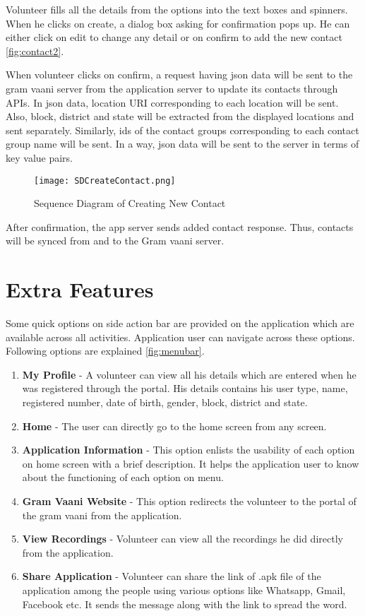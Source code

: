 \begin{itemize}
Volunteer fills all the details from the options into the text boxes and spinners. When he clicks on create, a dialog box asking for confirmation pops up. He can either click on edit to change any detail or on confirm to add the new contact \ref{fig:contact2}.

When volunteer clicks on confirm, a request having json data will be sent to the  gram vaani server from the application server to update its contacts through APIs. In json data, location URI corresponding to each location will be sent. Also, block, district and state will be extracted from the displayed locations and sent separately. Similarly, ids of the contact groups corresponding to each contact group name will be sent. In a way, json data will be sent to the server in terms of key value pairs.

\begin{figure}[H]
    \centering
	\texttt{[image: SDCreateContact.png]}
    \caption{ Sequence Diagram of Creating New Contact}
    \label{fig:Sequence Diagram of Creating New Contact}
\end{figure}

 After confirmation, the app server sends added contact response. Thus, contacts will be synced from and to the Gram vaani server.

\section{Extra Features}

Some quick options on side action bar are provided on the application which are available across all activities. Application  user can navigate across these options. Following options are explained \ref{fig:menubar}.
\begin{enumerate}
\item \textbf {My Profile} - A volunteer can view all his details which are entered when he was registered through the portal. His details contains his user type, name, registered number, date of birth, gender, block, district and state.
\item \textbf{Home} - The user can directly go to the home screen from any screen.
\item \textbf{Application Information} - This option enlists the usability of each option on home screen with a brief description. It helps the application user to know about the functioning of each option on menu.
\item \textbf{Gram Vaani Website} - This option redirects the volunteer to the portal of the gram vaani from the application.
\item \textbf{View Recordings} - Volunteer can view all the recordings he did directly from the application.
\item \textbf{Share Application} - Volunteer can share the link of .apk file of the application among the people using various options like Whatsapp, Gmail, Facebook etc. It sends the message along with the link to spread the word.
\end{enumerate}



\end{itemize}
